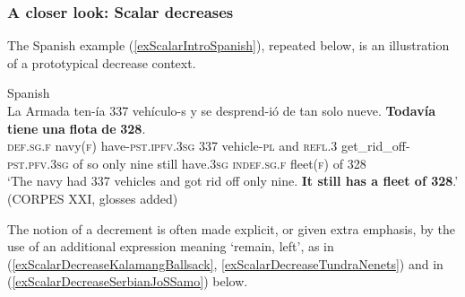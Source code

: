 \subsubsection{A closer look: Scalar decreases} The Spanish example (\ref{exScalarIntroSpanish}), repeated below, is an illustration of a prototypical decrease context.\pagebreak

\begin{exe}
	 Spanish\\
	\gll La Armada ten-ía 337 vehículo-s y se desprend-ió de tan solo nueve. \textbf{Todavía} \textbf{tiene} \textbf{una} \textbf{flota} \textbf{de} \textbf{328}.\\
\textsc{def}.\textsc{sg}.\textsc{f} navy(\textsc{f}) have-\textsc{pst}.\textsc{ipfv}.3\textsc{sg} 337 vehicle-\textsc{pl} and \textsc{refl}.3 get\_rid\_off-\textsc{pst}.\textsc{pfv}.3\textsc{sg} of so only nine still have.3\textsc{sg} \textsc{indef}.\textsc{sg}.\textsc{f} fleet(\textsc{f}) of 328\\
	\glt \lq The navy had 337 vehicles and got rid off only nine. \textbf{It still has a fleet of 328}.\rq{ }(CORPES XXI,  glosses added)
\end{exe}

The notion of a decrement is often made explicit, or given extra emphasis, by the use of an additional expression meaning \lq remain, left\rq{}, as in (\ref{exScalarDecreaseKalamangBallsack}, \ref{exScalarDecreaseTundraNenets}) and in (\ref{exScalarDecreaseSerbianJoSSamo}) below.

